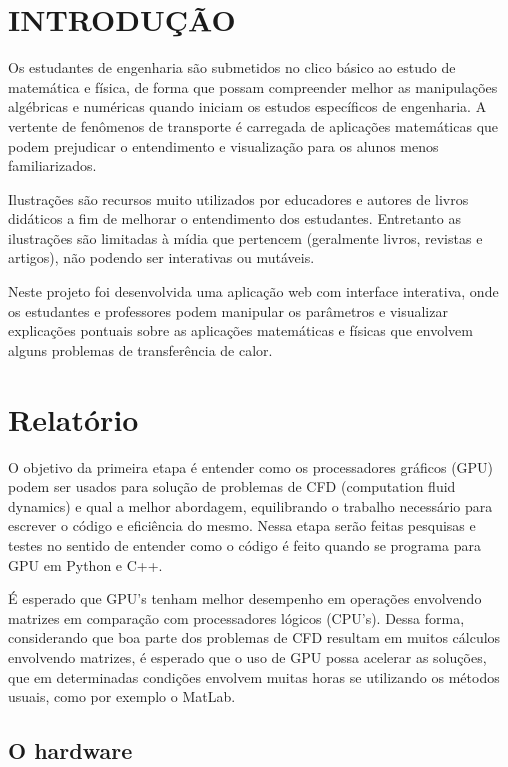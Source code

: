 \documentclass[12pt,a4paper]{article}
\begin{document}
\newpage

\section{INTRODUÇÃO}

Os estudantes de engenharia são submetidos no clico básico ao estudo de matemática e física, de forma que possam compreender melhor as manipulações algébricas e numéricas quando iniciam os estudos específicos de engenharia. A vertente de fenômenos de transporte é carregada de aplicações matemáticas que podem prejudicar o entendimento e visualização para os alunos menos familiarizados.

Ilustrações são recursos muito utilizados por educadores e autores de livros didáticos a fim de melhorar o entendimento dos estudantes. Entretanto as ilustrações são limitadas à mídia que pertencem (geralmente livros, revistas e artigos), não podendo ser interativas ou mutáveis.

Neste projeto foi desenvolvida uma aplicação web com interface interativa, onde os estudantes e professores podem manipular os parâmetros e visualizar explicações pontuais sobre as aplicações matemáticas e físicas que envolvem alguns problemas de transferência de calor.

\section{Relatório}

O objetivo da primeira etapa é entender como os processadores gráficos (GPU) podem ser usados para solução de problemas de CFD (computation fluid dynamics) e qual a melhor abordagem, equilibrando o trabalho necessário para escrever o código e eficiência do mesmo. Nessa etapa serão feitas pesquisas e testes no sentido de entender como o código é feito quando se programa para GPU em Python e C++.

É esperado que GPU's tenham melhor desempenho em operações envolvendo matrizes em comparação com processadores lógicos (CPU's). Dessa forma, considerando que boa parte dos problemas de CFD resultam em muitos cálculos envolvendo matrizes, é esperado que o uso de GPU possa acelerar as soluções, que em determinadas condições envolvem muitas horas se utilizando os métodos usuais, como por exemplo o MatLab.

\subsection{O hardware}
\end{document}
